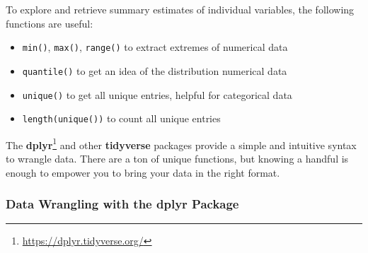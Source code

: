 \documentclass[
]{krantz}
\makeatletter
\newenvironment{Shaded}{\begin{snugshade}}{\end{snugshade}}
\newcommand{\DocumentationTok}[1]{\textcolor[rgb]{0.37,0.37,0.37}{\textbf{\textit{#1}}}}
\newcommand{\FunctionTok}[1]{\textcolor[rgb]{0.27,0.27,0.27}{\textbf{#1}}}
\newcommand{\NormalTok}[1]{#1}
\newcommand{\SpecialCharTok}[1]{\textcolor[rgb]{0.43,0.43,0.43}{\textbf{#1}}}
\providecommand{\tightlist}{%
  \setlength{\itemsep}{0pt}\setlength{\parskip}{0pt}}
\renewcommand{\href}[2]{#2\footnote{\url{#1}}}
\newenvironment{kframe}{%
\medskip{}
\setlength{\fboxsep}{.8em}
 \def\at@end@of@kframe{}%
 \ifinner\ifhmode%
  \def\at@end@of@kframe{\end{minipage}}%
  \begin{minipage}{\columnwidth}%
 \fi\fi%
 \def\FrameCommand##1{\hskip\@totalleftmargin \hskip-\fboxsep
 \colorbox{shadecolor}{##1}\hskip-\fboxsep
     \hskip-\linewidth \hskip-\@totalleftmargin \hskip\columnwidth}%
 \MakeFramed {\advance\hsize-\width
   \@totalleftmargin\z@ \linewidth\hsize
   \@setminipage}}%
 {\par\unskip\endMakeFramed%
 \at@end@of@kframe}
\renewenvironment{Shaded}{\begin{kframe}}{\end{kframe}}
\makeatother
\begin{document}
To explore and retrieve summary estimates of individual variables, the following functions are useful:

\begin{itemize}
\tightlist
\item
  \texttt{min()}, \texttt{max()}, \texttt{range()} to extract extremes of numerical data
\item
  \texttt{quantile()} to get an idea of the distribution numerical data
\item
  \texttt{unique()} to get all unique entries, helpful for categorical data
\item
  \texttt{length(unique())} to count all unique entries
\end{itemize}

\begin{Shaded}
\end{Shaded}

The \href{https://dplyr.tidyverse.org/}{\textbf{dplyr}} \citep{dplyr} and other \textbf{tidyverse} packages provide a simple and intuitive syntax to wrangle data. There are a ton of unique functions, but knowing a handful is enough to empower you to bring your data in the right format.

\hypertarget{dplyr}{%
\subsubsection{\texorpdfstring{Data Wrangling with the \textbf{dplyr} Package}{Data Wrangling with the dplyr Package}}\label{dplyr}}
\end{document}
